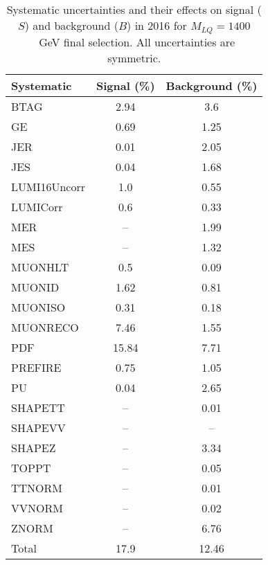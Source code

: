 \begin{table}[htbp]
\begin{center}
\caption{Systematic uncertainties and their effects on signal ($S$) and background ($B$) in 2016 for $M_{LQ}=1400$~GeV final selection. All uncertainties are symmetric.}
\begin{tabular}{lcc}
\hline\hline
Systematic & Signal (\%) & Background (\%) \\ \hline 
BTAG & 2.94 & 3.6\\ 
GE & 0.69 & 1.25\\ 
JER & 0.01 & 2.05\\ 
JES & 0.04 & 1.68\\ 
LUMI16Uncorr & 1.0 & 0.55\\ 
LUMICorr & 0.6 & 0.33\\ 
MER & -- & 1.99\\ 
MES & -- & 1.32\\ 
MUONHLT & 0.5 & 0.09\\ 
MUONID & 1.62 & 0.81\\ 
MUONISO & 0.31 & 0.18\\ 
MUONRECO & 7.46 & 1.55\\ 
PDF & 15.84 & 7.71\\ 
PREFIRE & 0.75 & 1.05\\ 
PU & 0.04 & 2.65\\ 
SHAPETT & -- & 0.01\\ 
SHAPEVV & -- & --\\ 
SHAPEZ & -- & 3.34\\ 
TOPPT & -- & 0.05\\ 
TTNORM & -- & 0.01\\ 
VVNORM & -- & 0.02\\ 
ZNORM & -- & 6.76\\ 
Total & 17.9 & 12.46\\ \hline \hline
\end{tabular}
\label{tab:SysUncertainties_uujj_1400}
\end{center}
\end{table}

